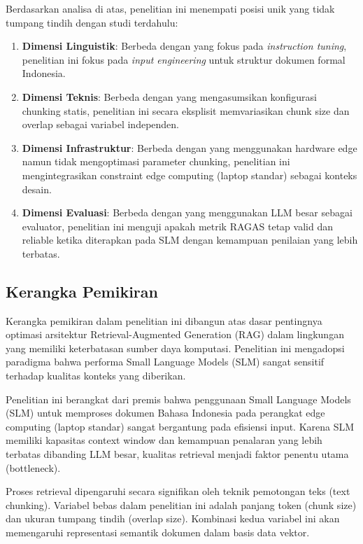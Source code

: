 Berdasarkan analisa di atas, penelitian ini menempati posisi unik yang tidak tumpang tindih dengan studi terdahulu:

\begin{enumerate}
	\item \textbf{Dimensi Linguistik}: Berbeda dengan \cite{cahyawijaya2024cendol} yang fokus pada \textit{instruction tuning}, penelitian ini fokus pada \textit{input engineering} untuk struktur dokumen formal Indonesia.
	
	\item \textbf{Dimensi Teknis}: Berbeda dengan \cite{hong2025innovative} yang mengasumsikan konfigurasi chunking statis, penelitian ini secara eksplisit memvariasikan chunk size dan overlap sebagai variabel independen.
	
	\item \textbf{Dimensi Infrastruktur}: Berbeda dengan \cite{suharyadi2025hybrid} yang menggunakan hardware edge namun tidak mengoptimasi parameter chunking, penelitian ini mengintegrasikan constraint edge computing (laptop standar) sebagai konteks desain.
	
	\item \textbf{Dimensi Evaluasi}: Berbeda dengan \cite{es2024ragas} yang menggunakan LLM besar sebagai evaluator, penelitian ini menguji apakah metrik RAGAS tetap valid dan reliable ketika diterapkan pada SLM dengan kemampuan penilaian yang lebih terbatas.
\end{enumerate}

\subsection{Kerangka Pemikiran}
Kerangka pemikiran dalam penelitian ini dibangun atas dasar pentingnya optimasi arsitektur Retrieval-Augmented Generation (RAG) dalam lingkungan yang memiliki keterbatasan sumber daya komputasi. Penelitian ini mengadopsi paradigma bahwa performa Small Language Models (SLM) sangat sensitif terhadap kualitas konteks yang diberikan.

Penelitian ini berangkat dari premis bahwa penggunaan Small Language Models (SLM) untuk memproses dokumen Bahasa Indonesia pada perangkat edge computing (laptop standar) sangat bergantung pada efisiensi input. Karena SLM memiliki kapasitas context window dan kemampuan penalaran yang lebih terbatas dibanding LLM besar, kualitas retrieval menjadi faktor penentu utama (bottleneck).

Proses retrieval dipengaruhi secara signifikan oleh teknik pemotongan teks (text chunking). Variabel bebas dalam penelitian ini adalah panjang token (chunk size) dan ukuran tumpang tindih (overlap size). Kombinasi kedua variabel ini akan memengaruhi representasi semantik dokumen dalam basis data vektor.

